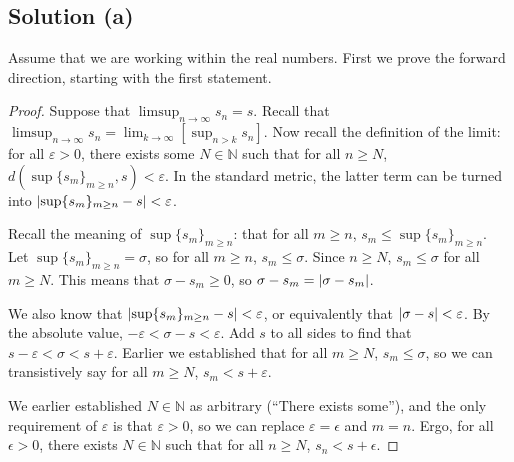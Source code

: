 \documentclass[11pt]{article}
\begin{document}
    \subsection{Solution (a)}
        Assume that we are working within the real numbers.
        First we prove the forward direction, starting with the first statement.
        \begin{proof}
            Suppose that $\limsup_{n \to \infty} s_n = s$.
            Recall that $\limsup_{n \to \infty} s_n = \lim_{k \to \infty} \left[ \sup_{n > k} s_n \right]$.
            Now recall the definition of the limit: for all $\varepsilon > 0$, there exists some $N \in \mathbb{N}$ such that for all $n \geq N$, $d(\sup\{s_m\}_{m \geq n}, s) < \varepsilon$.
            In the standard metric, the latter term can be turned into $\left| \sup\{s_m\}_{m \geq n} - s \right| < \varepsilon$.
            
            Recall the meaning of $\sup\{s_m\}_{m \geq n}$: that for all $m \geq n$, $s_m \leq \sup\{s_m\}_{m \geq n}$.
            Let $\sup\{s_m\}_{m \geq n} = \sigma$, so for all $m \geq n$, $s_m \leq \sigma$.
            Since $n \geq N$, $s_m \leq \sigma$ for all $m \geq N$.
            This means that $\sigma - s_m \geq 0$, so $\sigma - s_m = \left| \sigma - s_m \right|$.

            We also know that $\left| \sup\{s_m\}_{m \geq n} - s \right| < \varepsilon$, or equivalently that $\left| \sigma - s \right| < \varepsilon$.
            By the absolute value, $-\varepsilon < \sigma - s < \varepsilon$.
            Add $s$ to all sides to find that $s - \varepsilon < \sigma < s + \varepsilon$.
            Earlier we established that for all $m \geq N$, $s_m \leq \sigma$, so we can transistively say for all $m \geq N$, $s_m < s + \varepsilon$.

            We earlier established $N \in \mathbb{N}$ as arbitrary (``There exists some''), and the only requirement of $\varepsilon$ is that $\varepsilon > 0$, so we can replace $\varepsilon = \epsilon$ and $m = n$.
            Ergo, for all $\epsilon > 0$, there exists $N \in \mathbb{N}$ such that for all $n \geq N$, $s_n < s + \epsilon$.
        \end{proof}
\end{document}
